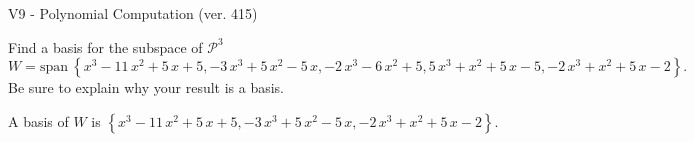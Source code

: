 \begin{exercise}
  \begin{exerciseTitle}V9 - Polynomial Computation (ver. 415)\end{exerciseTitle}
  \begin{exerciseStatement}
    Find a basis for the subspace of \(\mathcal{P}^3\) 
\[W=\mathrm{span}\ \left\{x^{3} - 11 \, x^{2} + 5 \, x + 5 , -3 \, x^{3} + 5 \, x^{2} - 5 \, x , -2 \, x^{3} - 6 \, x^{2} + 5 , 5 \, x^{3} + x^{2} + 5 \, x - 5 , -2 \, x^{3} + x^{2} + 5 \, x - 2\right\}.\]
 Be sure to explain why your result is a basis.


  \end{exerciseStatement}
  \begin{exerciseAnswer}
   A basis of \(W\) is  \(\left\{x^{3} - 11 \, x^{2} + 5 \, x + 5 , -3 \, x^{3} + 5 \, x^{2} - 5 \, x , -2 \, x^{3} + x^{2} + 5 \, x - 2\right\}\).
  


  \end{exerciseAnswer}
\end{exercise}